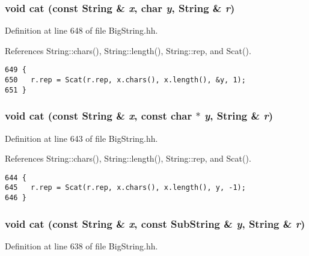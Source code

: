 \subsubsection{\setlength{\rightskip}{0pt plus 5cm}void cat (const {\bf String} \& {\em x}, char {\em y}, {\bf String} \& {\em r})\hspace{0.3cm}{\tt  [inline]}}\label{BigString_8hh_a37}




Definition at line 648 of file Big\-String.hh.

References String::chars(), String::length(), String::rep, and Scat().



\footnotesize\begin{verbatim}649 {
650   r.rep = Scat(r.rep, x.chars(), x.length(), &y, 1);
651 }
\end{verbatim}\normalsize 
{}
\subsubsection{\setlength{\rightskip}{0pt plus 5cm}void cat (const {\bf String} \& {\em x}, const char $\ast$ {\em y}, {\bf String} \& {\em r})\hspace{0.3cm}{\tt  [inline]}}\label{BigString_8hh_a36}




Definition at line 643 of file Big\-String.hh.

References String::chars(), String::length(), String::rep, and Scat().



\footnotesize\begin{verbatim}644 {
645   r.rep = Scat(r.rep, x.chars(), x.length(), y, -1);
646 }
\end{verbatim}\normalsize 
{}
\subsubsection{\setlength{\rightskip}{0pt plus 5cm}void cat (const {\bf String} \& {\em x}, const {\bf Sub\-String} \& {\em y}, {\bf String} \& {\em r})\hspace{0.3cm}{\tt  [inline]}}\label{BigString_8hh_a35}




Definition at line 638 of file Big\-String.hh.

